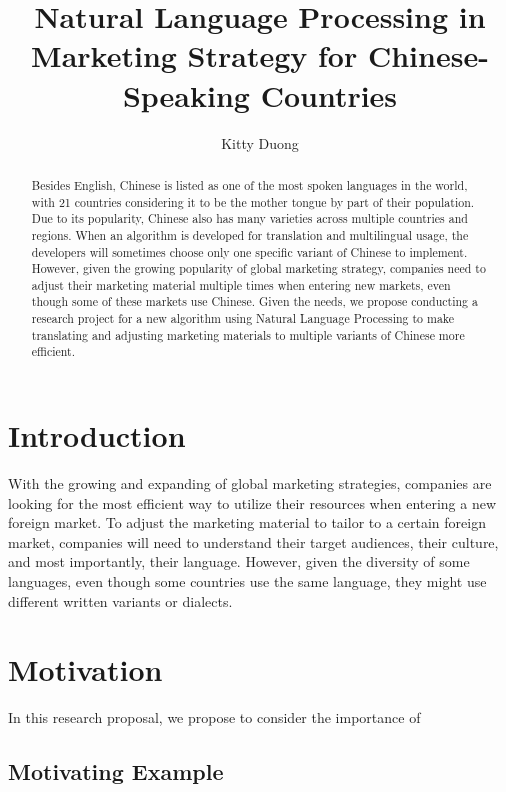 \documentclass[sigconf]{acmart}
\begin{document}
\title{Natural Language Processing in Marketing Strategy for Chinese-Speaking Countries}
\author{Kitty Duong}

\begin{abstract}
Besides English, Chinese is listed as one of the most spoken languages in the world, with 21 countries considering it to be the mother tongue by part of their population. Due to its popularity, Chinese also has many varieties across multiple countries and regions. When an algorithm is developed for translation and multilingual usage, the developers will sometimes choose only one specific variant of Chinese to implement. However, given the growing popularity of global marketing strategy, companies need to adjust their marketing material multiple times when entering new markets, even though some of these markets use Chinese. Given the needs, we propose conducting a research project for a new algorithm using Natural Language Processing to make translating and adjusting marketing materials to multiple variants of Chinese more efficient.
\end{abstract}


\maketitle

\section{Introduction}
With the growing and expanding of global marketing strategies, companies are looking for the most efficient way to utilize their resources when entering a new foreign market. To adjust the marketing material to tailor to a certain foreign market, companies will need to understand their target audiences, their culture, and most importantly, their language. However, given the diversity of some languages, even though some countries use the same language, they might use different written variants or dialects. 

\section{Motivation}
In this research proposal, we propose to consider the importance of 

\subsection{Motivating Example}
\end{document}
